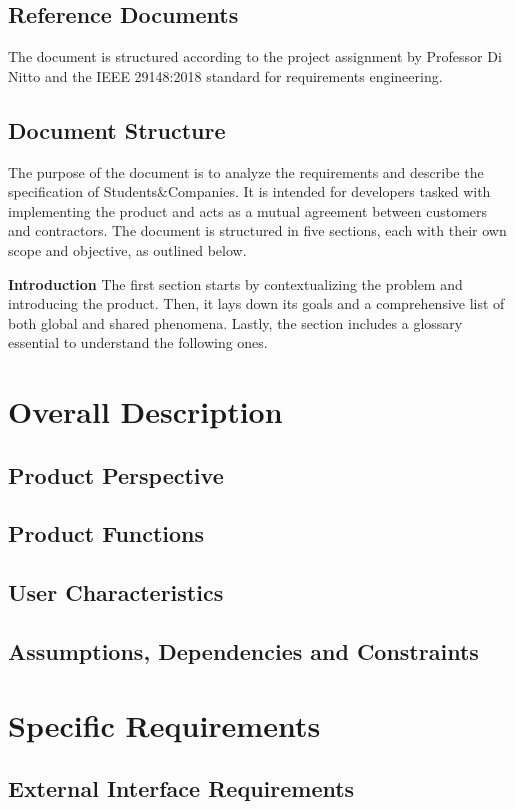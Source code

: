 \documentclass[a4paper, oneside]{book}
\begin{document}
\section{Reference Documents}
The document is structured according to the project assignment \cite{project2024} by Professor Di Nitto and the IEEE 29148:2018 \cite{ieee2018} standard for requirements engineering.

\section{Document Structure}
The purpose of the document is to analyze the requirements and describe the specification of Students\&Companies.
It is intended for developers tasked with implementing the product and acts as a mutual agreement between customers and contractors.
The document is structured in five sections, each with their own scope and objective, as outlined below.

\textbf{Introduction} The first section starts by contextualizing the problem and introducing the product.
Then, it lays down its goals and a comprehensive list of both global and shared phenomena.
Lastly, the section includes a glossary essential to understand the following ones.

\chapter{Overall Description}
\section{Product Perspective}
\section{Product Functions}
\section{User Characteristics}
\section{Assumptions, Dependencies and Constraints}

\chapter{Specific Requirements}
\section{External Interface Requirements}
\end{document}
